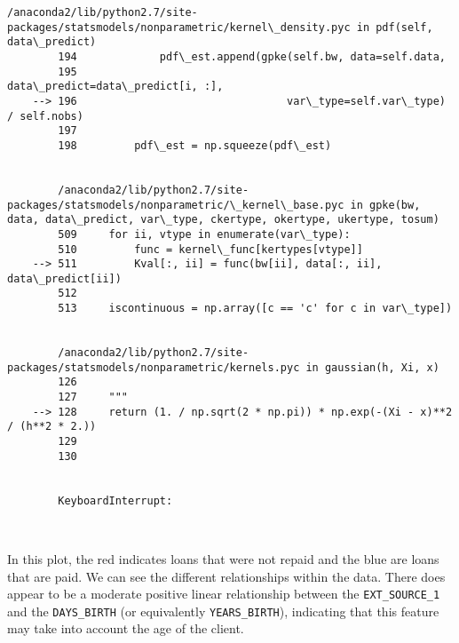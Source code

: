 \documentclass[11pt]{article}
\begin{document}
\begin{Verbatim}[commandchars=\\\{\}]
        /anaconda2/lib/python2.7/site-packages/statsmodels/nonparametric/kernel\_density.pyc in pdf(self, data\_predict)
        194             pdf\_est.append(gpke(self.bw, data=self.data,
        195                                 data\_predict=data\_predict[i, :],
    --> 196                                 var\_type=self.var\_type) / self.nobs)
        197 
        198         pdf\_est = np.squeeze(pdf\_est)


        /anaconda2/lib/python2.7/site-packages/statsmodels/nonparametric/\_kernel\_base.pyc in gpke(bw, data, data\_predict, var\_type, ckertype, okertype, ukertype, tosum)
        509     for ii, vtype in enumerate(var\_type):
        510         func = kernel\_func[kertypes[vtype]]
    --> 511         Kval[:, ii] = func(bw[ii], data[:, ii], data\_predict[ii])
        512 
        513     iscontinuous = np.array([c == 'c' for c in var\_type])


        /anaconda2/lib/python2.7/site-packages/statsmodels/nonparametric/kernels.pyc in gaussian(h, Xi, x)
        126 
        127     """
    --> 128     return (1. / np.sqrt(2 * np.pi)) * np.exp(-(Xi - x)**2 / (h**2 * 2.))
        129 
        130 


        KeyboardInterrupt: 

    \end{Verbatim}

    \begin{center}
    \end{center}
    { \hspace*{\fill} \\}
    
    In this plot, the red indicates loans that were not repaid and the blue
are loans that are paid. We can see the different relationships within
the data. There does appear to be a moderate positive linear
relationship between the \texttt{EXT\_SOURCE\_1} and the
\texttt{DAYS\_BIRTH} (or equivalently \texttt{YEARS\_BIRTH}), indicating
that this feature may take into account the age of the client.
\end{document}
